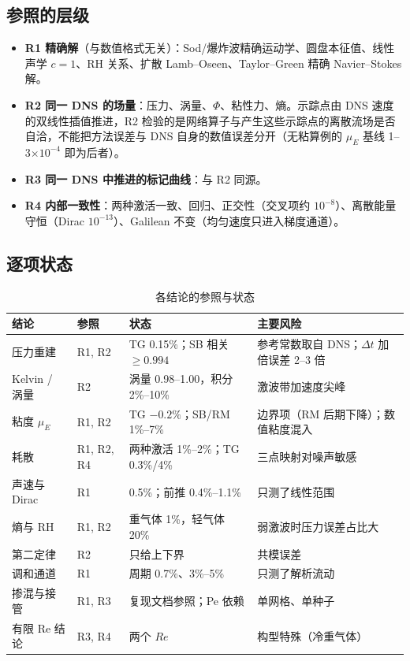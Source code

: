 \documentclass[11pt,a4paper]{article}
\begin{document}
\subsection{参照的层级}
\begin{itemize}
\item \textbf{R1 精确解}（与数值格式无关）：Sod/爆炸波精确运动学、圆盘本征值、线性声学 $c=1$、RH 关系、扩散 Lamb–Oseen、Taylor–Green 精确 Navier–Stokes 解。
\item \textbf{R2 同一 DNS 的场量}：压力、涡量、$\Phi$、粘性力、熵。示踪点由 DNS 速度的双线性插值推进，R2 检验的是网络算子与产生这些示踪点的离散流场是否自洽，不能把方法误差与 DNS 自身的数值误差分开（无粘算例的 $\mu_E$ 基线 1–3$\times10^{-4}$ 即为后者）。
\item \textbf{R3 同一 DNS 中推进的标记曲线}：与 R2 同源。
\item \textbf{R4 内部一致性}：两种激活一致、回归、正交性（交叉项约 $10^{-8}$）、离散能量守恒（Dirac $10^{-13}$）、Galilean 不变（均匀速度只进入梯度通道）。
\end{itemize}

\subsection{逐项状态}
\begin{table}[h]\centering\small\caption{各结论的参照与状态}\label{tab:ver}
\begin{tabular}{p{3.3cm}p{2.0cm}p{4.6cm}p{5.2cm}}\toprule
结论 & 参照 & 状态 & 主要风险\\\midrule
压力重建 & R1, R2 & TG 0.15\%；SB 相关 $\ge0.994$ & 参考常数取自 DNS；$\Delta t$ 加倍误差 2–3 倍\\
Kelvin / 涡量 & R2 & 涡量 0.98–1.00，积分 2\%–10\% & 激波带加速度尖峰\\
粘度 $\mu_E$ & R1, R2 & TG $-0.2\%$；SB/RM 1\%–7\% & 边界项（RM 后期下降）；数值粘度混入\\
耗散 & R1, R2, R4 & 两种激活 1\%–2\%；TG 0.3\%/4\% & 三点映射对噪声敏感\\
声速与 Dirac & R1 & 0.5\%；前推 0.4\%–1.1\% & 只测了线性范围\\
熵与 RH & R1, R2 & 重气体 1\%，轻气体 20\% & 弱激波时压力误差占比大\\
第二定律 & R2 & 只给上下界 & 共模误差\\
调和通道 & R1 & 周期 0.7\%、3\%–5\% & 只测了解析流动\\
掺混与接管 & R1, R3 & 复现文档参照；Pe 依赖 & 单网格、单种子\\
有限 Re 结论 & R3, R4 & 两个 $Re$ & 构型特殊（冷重气体）\\\bottomrule
\end{tabular}\end{table}
\end{document}
